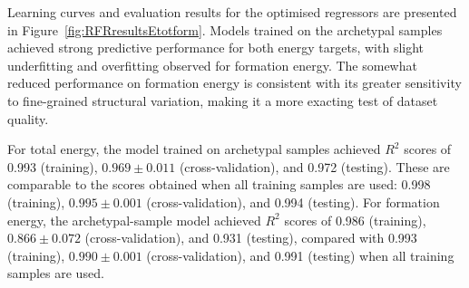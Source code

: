 \documentclass{WileyMSP-template}
\begin{document}
Learning curves and evaluation results for the optimised regressors are presented in Figure~\ref{fig:RFRresultsEtotform}. Models trained on the archetypal samples achieved strong predictive performance for both energy targets, with slight underfitting and overfitting observed for formation energy. The somewhat reduced performance on formation energy is consistent with its greater sensitivity to fine-grained structural variation, making it a more exacting test of dataset quality.

For total energy, the model trained on archetypal samples achieved $R^2$ scores of 0.993 (training), $0.969 \pm 0.011$ (cross-validation), and 0.972 (testing). These are comparable to the scores obtained when all training samples are used: 0.998 (training), $0.995 \pm 0.001$ (cross-validation), and 0.994 (testing). For formation energy, the archetypal-sample model achieved $R^2$ scores of 0.986 (training), $0.866 \pm 0.072$ (cross-validation), and 0.931 (testing), compared with 0.993 (training), $0.990 \pm 0.001$ (cross-validation), and 0.991 (testing) when all training samples are used.
\end{document}

